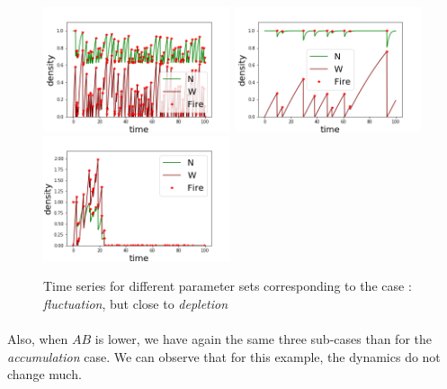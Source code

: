 \documentclass{article}
\begin{document}
\begin{figure}[h!]
\centering
\includegraphics[width=5.5cm]{equivalent_high_1.png}
\includegraphics[width=5.5cm]{equivalent_high_3.png} \\
\includegraphics[width=5.5cm]{equivalent_high_2.png}
\caption{Time series for different parameter sets corresponding to the case : \textit{fluctuation}, but close to \textit{depletion}}
\end{figure}

\newpage
\paragraph{}
Also, when $AB$ is lower, we have again the same three sub-cases than for the \textit{accumulation} case. We can observe that for this example, the dynamics do not change much.%

\end{document}
